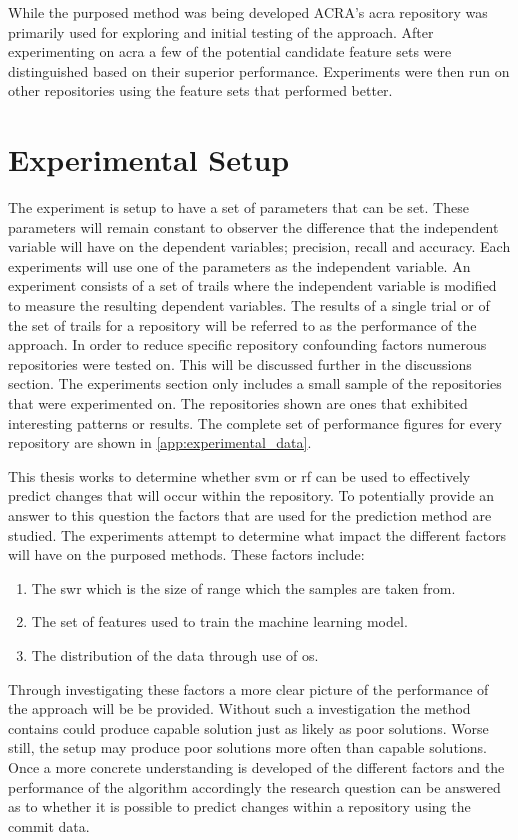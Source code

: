 While the purposed method was being developed ACRA's acra repository was primarily used for exploring and initial testing of the approach. After experimenting on acra a few of the potential candidate feature sets were distinguished based on their superior performance. Experiments were then run on other repositories using the feature sets that performed better.

\section{Experimental Setup}


The experiment is setup to have a set of parameters that can be set. These parameters will remain constant to observer the difference that the independent variable will have on the dependent variables; precision, recall and accuracy. Each experiments will use one of the parameters as the independent variable. An experiment consists of a set of trails where the independent variable is modified to measure the resulting dependent variables. The results of a single trial or of the set of trails for a repository will be referred to as the performance of the approach. In order to reduce specific repository confounding factors numerous repositories were tested on. This will be discussed further in the discussions section. The experiments section only includes a small sample of the repositories that were experimented on. The repositories shown are ones that exhibited interesting patterns or results. The complete set of performance figures for every repository are shown in \autoref{app:experimental_data}.

This thesis works to determine whether \gls{svm} or \gls{rf} can be used to effectively predict changes that will occur within the repository. To potentially provide an answer to this question the factors that are used for the prediction method are studied. The experiments attempt to determine what impact the different factors will have on the purposed methods. These factors include:
\begin{enumerate}
\item The \gls{swr} which is the size of range which the samples are taken from.
\item The set of features used to train the machine learning model.
\item The distribution of the data through use of \gls{os}.
\end{enumerate}

Through investigating these factors a more clear picture of the performance of the approach will be be provided. Without such a investigation the method contains could produce capable solution just as likely as poor solutions. Worse still, the setup may produce poor solutions more often than capable solutions. Once a more concrete understanding is developed of the different factors and the performance of the algorithm accordingly the research question can be answered as to whether it is possible to predict changes within a repository using the commit data.

